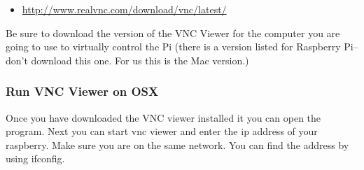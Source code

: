 \begin{itemize}
\tightlist
\item
  \href{http://www.realvnc.com/download/vnc/latest/\%5D}{http://www.realvnc.com/download/vnc/latest/}
\end{itemize}

Be sure to download the version of the VNC Viewer for the computer you
are going to use to virtually control the Pi (there is a version listed
for Raspberry Pi-- don't download this one. For us this is the Mac
version.)

\subsubsection{Run VNC Viewer on OSX}\label{run-vnc-viewer-on-osx}

Once you have downloaded the VNC viewer installed it you can open the
program. Next you can start vnc viewer and enter the ip address of your
raspberry. Make sure you are on the same network. You can find the
address by using ifconfig.
